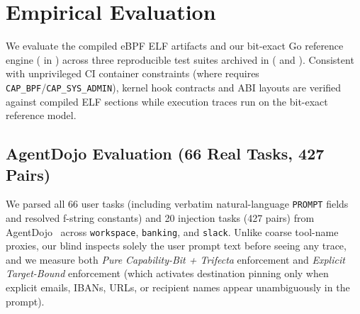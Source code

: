 \documentclass[10pt,twocolumn,letterpaper]{article}
\newcommand{\code}[1]{\texttt{\small #1}}
\begin{document}
\section{Empirical Evaluation}
\label{sec:eval}

We evaluate the compiled eBPF ELF artifacts and our bit-exact Go reference engine ( in ) across three reproducible test suites archived in  ( and ). Consistent with unprivileged CI container constraints (where  requires \code{CAP\_BPF}/\code{CAP\_SYS\_ADMIN}), kernel hook contracts and ABI layouts are verified against compiled ELF sections while execution traces run on the bit-exact reference model.

\subsection{AgentDojo Evaluation (66 Real Tasks, 427 Pairs)}
We parsed all 66 user tasks (including verbatim natural-language \code{PROMPT} fields and resolved f-string constants) and 20 injection tasks (427 pairs) from AgentDojo~\cite{agentdojo2024} across \code{workspace}, \code{banking}, and \code{slack}. Unlike coarse tool-name proxies, our blind  inspects solely the user prompt text before seeing any trace, and we measure both \emph{Pure Capability-Bit + Trifecta} enforcement and \emph{Explicit Target-Bound} enforcement (which activates destination pinning only when explicit emails, IBANs, URLs, or recipient names appear unambiguously in the prompt).
\end{document}
